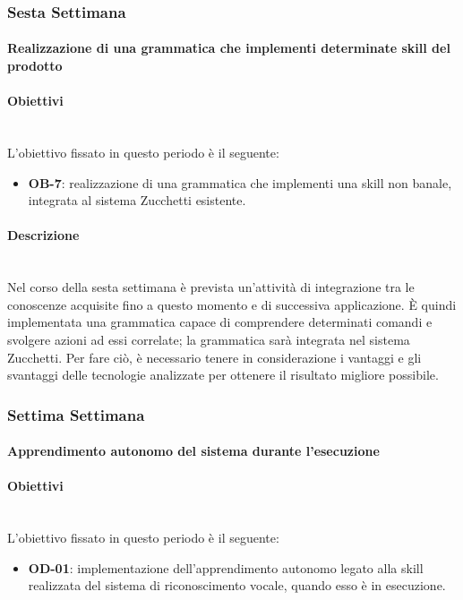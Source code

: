 {     \subsubsection{Sesta Settimana}
     	\paragraph{Realizzazione di una grammatica che implementi determinate skill del prodotto}
     	\paragraph*{Obiettivi} \mbox{}\\ [1mm]
		L'obiettivo fissato in questo periodo è il seguente:
        \begin{itemize}
            \item \textbf{OB-7}: realizzazione di una grammatica che implementi una skill non banale, integrata al sistema Zucchetti esistente.
        \end{itemize}
	    \paragraph*{Descrizione} \mbox{}\\ [1mm]
    	Nel corso della sesta settimana è prevista un'attività di integrazione tra le conoscenze acquisite fino a questo momento e di successiva applicazione. È quindi implementata una grammatica capace di comprendere determinati comandi e svolgere azioni ad essi correlate; la grammatica sarà integrata nel sistema Zucchetti. Per fare ciò, è necessario tenere in considerazione i vantaggi e gli svantaggi delle tecnologie analizzate per ottenere il risultato migliore possibile.
    \subsubsection{Settima Settimana}
    	\paragraph{Apprendimento autonomo del sistema durante l'esecuzione}
    	\paragraph*{Obiettivi} \mbox{}\\ [1mm]
    	L'obiettivo fissato in questo periodo è il seguente:
        \begin{itemize}
            \item \textbf{OD-01}: implementazione dell'apprendimento autonomo legato alla skill realizzata del sistema di riconoscimento vocale, quando esso è in esecuzione.
        \end{itemize}
}
